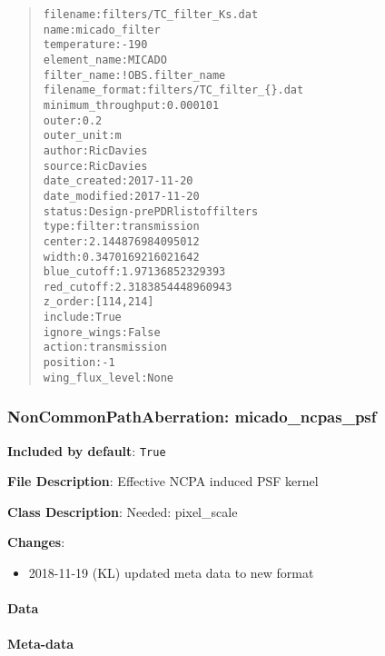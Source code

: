 \documentclass[a4paper]{article}
\begin{document}
\begin{quote}
\begin{alltt}
          filename : filters/TC_filter_Ks.dat
              name : micado_filter
       temperature : -190
      element_name : MICADO
       filter_name : !OBS.filter_name
   filename_format : filters/TC_filter_\{\}.dat
minimum_throughput : 0.000101
             outer : 0.2
        outer_unit : m
            author : Ric Davies
            source : Ric Davies
      date_created : 2017-11-20
     date_modified : 2017-11-20
            status : Design - pre PDR list of filters
              type : filter:transmission
            center : 2.144876984095012
             width : 0.3470169216021642
       blue_cutoff : 1.97136852329393
        red_cutoff : 2.3183854448960943
           z_order : [114, 214]
           include : True
      ignore_wings : False
            action : transmission
          position : -1
   wing_flux_level : None
\end{alltt}
\end{quote}


\subsubsection{NonCommonPathAberration: \textquotedbl{}micado\_ncpas\_psf\textquotedbl{}%
  \label{noncommonpathaberration-micado-ncpas-psf}%
}

\textbf{Included by default}: \texttt{True}

\textbf{File Description}: Effective NCPA induced PSF kernel

\textbf{Class Description}: Needed: pixel\_scale

\textbf{Changes}:

\begin{itemize}
\item 2018-11-19 (KL) updated meta data to new format
\end{itemize}


\paragraph{Data%
  \label{id19}%
}


\paragraph{Meta-data%
  \label{id20}%
}
\end{document}
